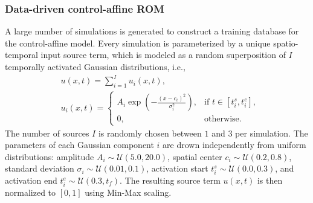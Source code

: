 \documentclass{article}
\begin{document}
\subsubsection{Data-driven control-affine ROM}
A large number of simulations is generated to construct a training database for the control-affine model.
Every simulation is parameterized by a unique spatio-temporal input source term, which is modeled as a random superposition of $I$ temporally activated Gaussian distributions, i.e.,
\begin{equation}
\label{eq:input-heat}
\begin{aligned}
    &u(x,t) = \sum_{i=1}^I u_i(x,t), \\
    &u_i(x,t)=\begin{cases}
         A_i \exp\!\left(-\frac{(x-c_i)^2}{\sigma_i^2}\right), &\text{if } t\in [t_i^s, t_i^e],\\ 
         0, & \mathrm{otherwise}.
    \end{cases}
\end{aligned}
\end{equation}
The number of sources $I$ is randomly chosen between $1$ and $3$ per simulation.
The parameters of each Gaussian component $i$ are drown independently from uniform distributions: amplitude $A_i \sim \mathcal{U}(5.0, 20.0)$, spatial center $c_i \sim \mathcal{U}(0.2, 0.8)$, standard deviation $\sigma_i \sim \mathcal{U}(0.01, 0.1)$, activation start $t_i^s \sim \mathcal{U}(0.0, 0.3)$, and activation end $t_i^e \sim \mathcal{U}(0.3, t_f)$.
The resulting source term $u(x,t)$ is then normalized to $[0,1]$ using Min-Max scaling.
\end{document}
